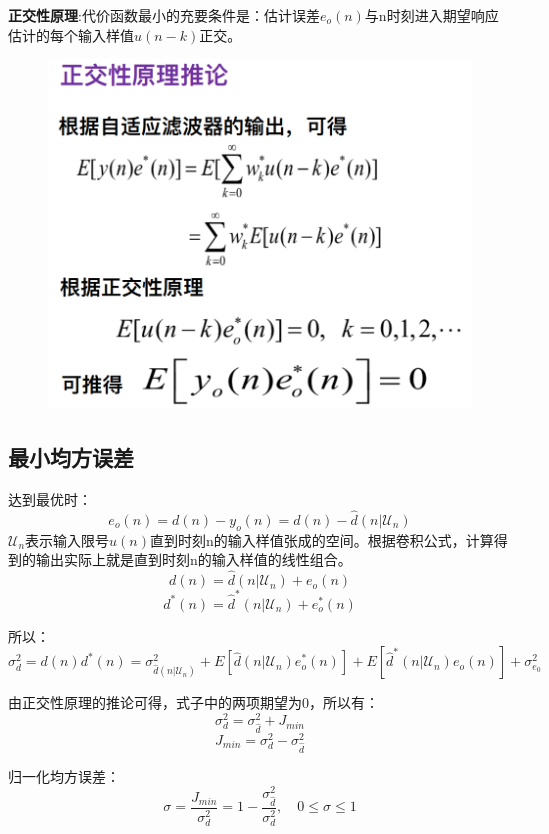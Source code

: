\documentclass[UTF8]{ctexart} %
\begin{document}
			\textbf{正交性原理}:代价函数最小的充要条件是：估计误差$e_o(n)$与n时刻进入期望响应估计的每个输入样值$u(n-k)$正交。
			\begin{figure}[H]
				\centering\includegraphics[scale=0.25]{11.png}
			\end{figure}
		\subsection{最小均方误差}
			达到最优时：
			\[e_o(n) = d(n) - y_o(n) = d(n) - \hat{d}(n|\mathcal{U}_n)\]
			$\mathcal{U}_n$表示输入限号$u(n)$直到时刻n的输入样值张成的空间。根据卷积公式，计算得到的输出实际上就是直到时刻n的输入样值的线性组合。
			\[d(n) = \hat{d}(n|\mathcal{U}_n) +e_o(n)\]	
			\[d^*(n) = \hat{d}^*(n|\mathcal{U}_n) +e_o^*(n)\]	
			
			所以：
			\[\sigma_d^2 = d(n)d^*(n) = \sigma_{\hat{d}(n|\mathcal{U}_n)}^2 + E[\hat{d}(n|\mathcal{U}_n)e_o^*(n)]+ E[\hat{d}^*(n|\mathcal{U}_n)e_o(n)]+ \sigma_{e_0}^2\]
			
			由正交性原理的推论可得，式子中的两项期望为0，所以有：
			\[\sigma_d^2 = \sigma_{\hat{d}}^2 + J_{min}\]
			\[ J_{min} = \sigma_d^2 - \sigma_{\hat{d}}^2\]
			
			归一化均方误差：
			\[\sigma = \frac{J_{min}}{\sigma_d^2} = 1-\frac{\sigma_{\hat{d}}^2}{\sigma_d^2}, \quad 0\leq \sigma\leq1\]
\end{document}
